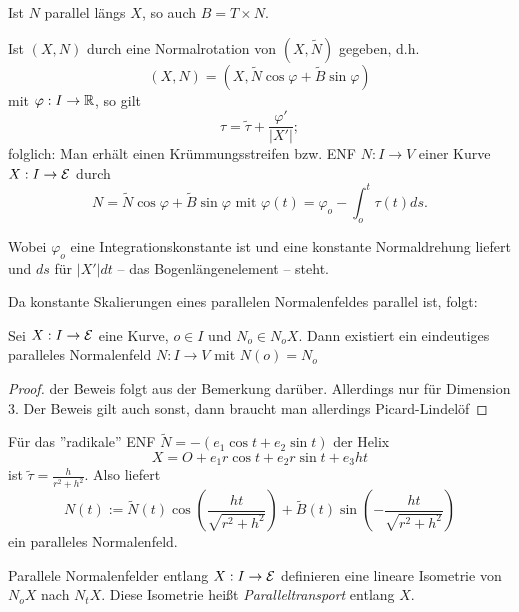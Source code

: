 \begin{remark}
	Ist $N$ parallel längs $X$, so auch $B = T\times N.$
\end{remark}

\begin{remark}
	Ist $(X,N)$ durch eine Normalrotation von $(X, \widetilde{N})$ gegeben, d.h. \[ (X,N) = (X,\widetilde{N} \cos \varphi + \widetilde{B}\sin \varphi) \] mit $\varphi: I \rightarrow \mathbb R$, so gilt 
	\[ \tau = \widetilde{\tau} + \frac{\varphi '}{|X'|}; \]
	folglich: Man erhält einen Krümmungsstreifen bzw. ENF $N: I \rightarrow V$ einer Kurve $X: I \rightarrow \mathcal E$ durch \[ N = \widetilde{N} \cos \varphi + \widetilde{B} \sin \varphi \text{ mit } \varphi(t) = \varphi_o - \int_{o}^{t} \tau(t) ds. \]
	
	Wobei $\varphi_o$ eine Integrationskonstante ist und eine konstante Normaldrehung liefert und $ds$ für $|X'| dt$ -- das Bogenlängenelement -- steht.
	
	Da konstante Skalierungen eines parallelen Normalenfeldes parallel ist, folgt:
	
	
\end{remark}

\begin{lemma}
	Sei $X: I \rightarrow \mathcal E$ eine Kurve, $o \in I$ und $N_o \in N_oX$. Dann existiert ein eindeutiges paralleles Normalenfeld $N: I \rightarrow V$ mit $N(o) = N_o$
\end{lemma}

\begin{proof}
	der Beweis folgt aus der Bemerkung darüber. Allerdings nur für Dimension 3. Der Beweis gilt auch sonst, dann braucht man allerdings Picard-Lindelöf
\end{proof}

\begin{example}
	Für das ''radikale'' ENF $\widetilde{N} = - (e_1 \cos t + e_2 \sin t)$ der Helix
	$$ X = O + e_1 r \cos t + e_2 r \sin t + e_3 h t$$
	ist $\widetilde{\tau} = \frac{h}{r^2 + h^2}$. Also liefert \[ N(t) := \widetilde{N}(t) \cos (\frac{ht}{\sqrt{r^2 + h^2}}) + \widetilde{B}(t) \sin (-\frac{ht}{\sqrt{r^2 + h^2}}) \] ein paralleles Normalenfeld.

\end{example}

\begin{lemma, definition}
	Parallele Normalenfelder entlang $X: I \rightarrow \mathcal E$ definieren eine lineare Isometrie von $N_oX$ nach $N_tX$. Diese Isometrie heißt \emph{Paralleltransport} entlang $X$.
\end{lemma, definition}

